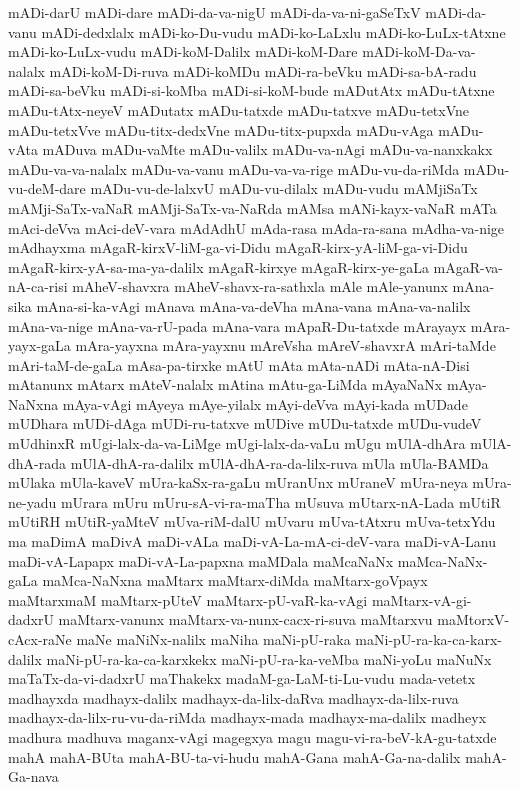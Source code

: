 {mADi-darU
mADi-dare
mADi-da-va-nigU
mADi-da-va-ni-gaSeTxV
mADi-da-vanu
mADi-dedxlalx
mADi-ko-Du-vudu
mADi-ko-LaLxlu
mADi-ko-LuLx-tAtxne
mADi-ko-LuLx-vudu
mADi-koM-Dalilx
mADi-koM-Dare
mADi-koM-Da-va-nalalx
mADi-koM-Di-ruva
mADi-koMDu
mADi-ra-beVku
mADi-sa-bA-radu
mADi-sa-beVku
mADi-si-koMba
mADi-si-koM-bude
mADutAtx
mADu-tAtxne
mADu-tAtx-neyeV
mADutatx
mADu-tatxde
mADu-tatxve
mADu-tetxVne
mADu-tetxVve
mADu-titx-dedxVne
mADu-titx-pupxda
mADu-vAga
mADu-vAta
mADuva
mADu-vaMte
mADu-valilx
mADu-va-nAgi
mADu-va-nanxkakx
mADu-va-va-nalalx
mADu-va-vanu
mADu-va-va-rige
mADu-vu-da-riMda
mADu-vu-deM-dare
mADu-vu-de-lalxvU
mADu-vu-dilalx
mADu-vudu
mAMjiSaTx
mAMji-SaTx-vaNaR
mAMji-SaTx-va-NaRda
mAMsa
mANi-kayx-vaNaR
mATa
mAci-deVva
mAci-deV-vara
mAdAdhU
mAda-rasa
mAda-ra-sana
mAdha-va-nige
mAdhayxma
mAgaR-kirxV-liM-ga-vi-Didu
mAgaR-kirx-yA-liM-ga-vi-Didu
mAgaR-kirx-yA-sa-ma-ya-dalilx
mAgaR-kirxye
mAgaR-kirx-ye-gaLa
mAgaR-va-nA-ca-risi
mAheV-shavxra
mAheV-shavx-ra-sathxla
mAle
mAle-yanunx
mAna-sika
mAna-si-ka-vAgi
mAnava
mAna-va-deVha
mAna-vana
mAna-va-nalilx
mAna-va-nige
mAna-va-rU-pada
mAna-vara
mApaR-Du-tatxde
mArayayx
mAra-yayx-gaLa
mAra-yayxna
mAra-yayxnu
mAreVsha
mAreV-shavxrA
mAri-taMde
mAri-taM-de-gaLa
mAsa-pa-tirxke
mAtU
mAta
mAta-nADi
mAta-nA-Disi
mAtanunx
mAtarx
mAteV-nalalx
mAtina
mAtu-ga-LiMda
mAyaNaNx
mAya-NaNxna
mAya-vAgi
mAyeya
mAye-yilalx
mAyi-deVva
mAyi-kada
mUDade
mUDhara
mUDi-dAga
mUDi-ru-tatxve
mUDive
mUDu-tatxde
mUDu-vudeV
mUdhinxR
mUgi-lalx-da-va-LiMge
mUgi-lalx-da-vaLu
mUgu
mUlA-dhAra
mUlA-dhA-rada
mUlA-dhA-ra-dalilx
mUlA-dhA-ra-da-lilx-ruva
mUla
mUla-BAMDa
mUlaka
mUla-kaveV
mUra-kaSx-ra-gaLu
mUranUnx
mUraneV
mUra-neya
mUra-ne-yadu
mUrara
mUru
mUru-sA-vi-ra-maTha
mUsuva
mUtarx-nA-Lada
mUtiR
mUtiRH
mUtiR-yaMteV
mUva-riM-dalU
mUvaru
mUva-tAtxru
mUva-tetxYdu
ma
maDimA
maDivA
maDi-vALa
maDi-vA-La-mA-ci-deV-vara
maDi-vA-Lanu
maDi-vA-Lapapx
maDi-vA-La-papxna
maMDala
maMcaNaNx
maMca-NaNx-gaLa
maMca-NaNxna
maMtarx
maMtarx-diMda
maMtarx-goVpayx
maMtarxmaM
maMtarx-pUteV
maMtarx-pU-vaR-ka-vAgi
maMtarx-vA-gi-dadxrU
maMtarx-vanunx
maMtarx-va-nunx-cacx-ri-suva
maMtarxvu
maMtorxV-cAcx-raNe
maNe
maNiNx-nalilx
maNiha
maNi-pU-raka
maNi-pU-ra-ka-ca-karx-dalilx
maNi-pU-ra-ka-ca-karxkekx
maNi-pU-ra-ka-veMba
maNi-yoLu
maNuNx
maTaTx-da-vi-dadxrU
maThakekx
madaM-ga-LaM-ti-Lu-vudu
mada-vetetx
madhayxda
madhayx-dalilx
madhayx-da-lilx-daRva
madhayx-da-lilx-ruva
madhayx-da-lilx-ru-vu-da-riMda
madhayx-mada
madhayx-ma-dalilx
madheyx
madhura
madhuva
maganx-vAgi
magegxya
magu
magu-vi-ra-beV-kA-gu-tatxde
mahA
mahA-BUta
mahA-BU-ta-vi-hudu
mahA-Gana
mahA-Ga-na-dalilx
mahA-Ga-nava
}

